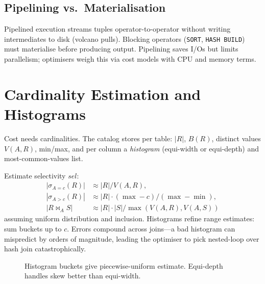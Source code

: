 \subsection{Pipelining vs.\ Materialisation}

Pipelined execution streams tuples operator-to-operator without writing intermediates to disk (volcano pulls). Blocking operators (\texttt{SORT}, \texttt{HASH BUILD}) must materialise before producing output. Pipelining saves I/Os but limits parallelism; optimisers weigh this via cost models with CPU and memory terms.

\section{Cardinality Estimation and Histograms}
\label{sec:estimation}

Cost needs cardinalities. The catalog stores per table: $|R|$, $B(R)$, distinct values $V(A,R)$, min/max, and per column a \emph{histogram} (equi-width or equi-depth) and most-common-values list.

Estimate selectivity $\mathit{sel}$:
\begin{align*}
| \sigma_{A=c}(R)| &\approx |R|/V(A,R),\\
| \sigma_{A>c}(R)| &\approx |R|\cdot (\max -c)/(\max-\min),\\
|R\bowtie_{A} S| &\approx |R|\cdot|S|/\max(V(A,R),V(A,S))
\end{align*}
assuming uniform distribution and inclusion. Histograms refine range estimates: sum buckets up to $c$. Errors compound across joins---a bad histogram can mispredict by orders of magnitude, leading the optimiser to pick nested-loop over hash join catastrophically.

\begin{figure}[h]
\centering
{}
\caption{Histogram buckets give piecewise-uniform estimate. Equi-depth handles skew better than equi-width.}
\label{fig:histogram}
\end{figure}

